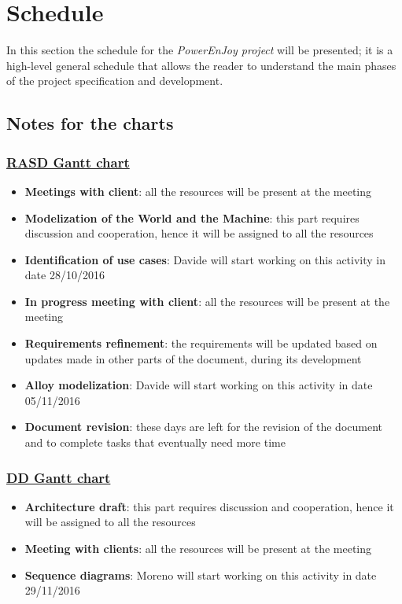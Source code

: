\section{Schedule}\label{sec:schedule}
In this section the schedule for the \emph{PowerEnJoy project} will be presented; it is a high-level general schedule that allows the reader to understand the main phases of the project specification and development.

\subsection{Notes for the charts}
\subsubsection{\hyperref[fig:rasdGantt]{RASD Gantt chart}}
\begin{itemize}
	\item \textbf{Meetings with client}: all the resources will be present at the meeting
	\item \textbf{Modelization of the World and the Machine}: this part requires discussion and cooperation, hence it will be assigned to all the resources
	\item \textbf{Identification of use cases}: Davide will start working on this activity in date 28/10/2016
	\item \textbf{In progress meeting with client}: all the resources will be present at the meeting
	\item \textbf{Requirements refinement}: the requirements will be updated based on updates made in other parts of the document, during its development
	\item \textbf{Alloy modelization}: Davide will start working on this activity in date 05/11/2016
	\item \textbf{Document revision}: these days are left for the revision of the document and to complete tasks that eventually need more time
\end{itemize}

\subsubsection{\hyperref[fig:ddGantt]{DD Gantt chart}}
\begin{itemize}
	\item \textbf{Architecture draft}: this part requires discussion and cooperation, hence it will be assigned to all the resources
	\item \textbf{Meeting with clients}: all the resources will be present at the meeting
	\item \textbf{Sequence diagrams}: Moreno will start working on this activity in date 29/11/2016
\end{itemize}

